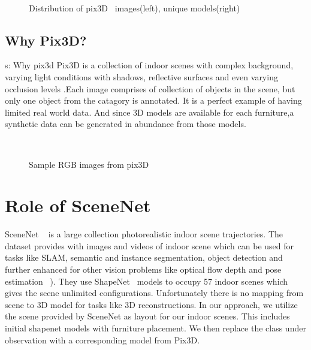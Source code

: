 \begin{figure}[!ht]
    \centering
    \quad
    \\
    \caption{Distribution of pix3D~\cite{pix3d} images(left), unique models(right)}
    \label{fig:pix3d_histogram}
\end{figure}

\subsection{Why Pix3D?}{s: Why pix3d}
    Pix3D is a collection of indoor scenes with complex background, varying light conditions with shadows, reflective surfaces and even varying occlusion levels
    .Each image comprises of collection of objects in the scene, but only one object from the catagory is annotated. It is a perfect example of having limited real world data.
    And since 3D models are available for each furniture,a synthetic data can be generated in abundance from those models.

\begin{figure}[!ht]
    \centering
    \quad
    \\
    \quad
    \caption{Sample RGB images from pix3D}
    \label{fig:Pix3D samples}
\end{figure}

\section{Role of SceneNet}\label{s:SceneNet}
    SceneNet ~\cite{McCormac:etal:ICCV2017} is a large collection photorealistic indoor scene trajectories.
    The dataset provides with images and videos of indoor scene which can be used for tasks like SLAM, semantic and instance segmentation,
object detection and further enhanced for other vision problems like optical flow depth and pose estimation ~\cite{McCormac:etal:ICCV2017}).
They use ShapeNet~\cite{chang2015shapenet} models to occupy 57 indoor scenes which gives the scene unlimited configurations.
Unfortunately there is no mapping from scene to 3D model for tasks like 3D reconstructions.
In our approach, we utilize the scene provided by SceneNet as layout for our indoor scenes. This includes initial shapenet models with furniture placement.
We then replace the class under observation with a corresponding model from Pix3D.


